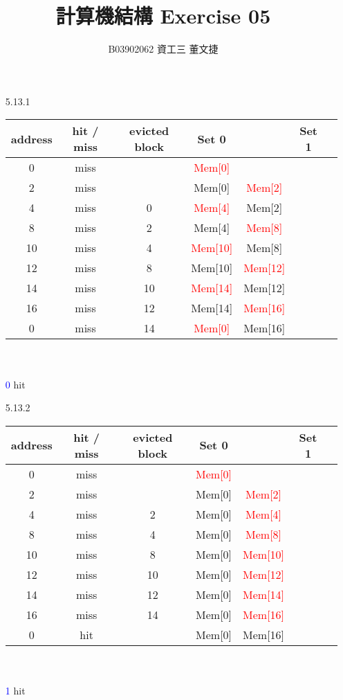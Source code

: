 \documentclass[12pt, a4paper]{article}
\date{}
\title{\vspace{-3.0cm} 計算機結構 \hspace{0cm} Exercise 05 \\ \vspace{0cm}}
\author{\normalsize B03902062 \hspace{0cm} 資工三 \hspace{0cm} 董文捷}
\begin{document}
\maketitle
\begin{itemize}[font=\bfseries]

\item[5.13.1]
\begin{tabular}[t]{|c|c|c|cc|cc|} 
\hline
address & hit / miss & evicted block & Set 0 &  & Set 1 & \\
\hline
0 & miss & & \textcolor{red}{Mem[0]} & & & \\
\hline
2 & miss & & Mem[0] & \textcolor{red}{Mem[2]} & & \\
\hline
4 & miss & 0 & \textcolor{red}{Mem[4]} & Mem[2] & & \\
\hline
8 & miss & 2 & Mem[4] & \textcolor{red}{Mem[8]} & & \\
\hline
10 & miss & 4 & \textcolor{red}{Mem[10]} & Mem[8] & & \\
\hline
12 & miss & 8 & Mem[10] & \textcolor{red}{Mem[12]} & & \\
\hline
14 & miss & 10 & \textcolor{red}{Mem[14]} & Mem[12] & & \\
\hline
16 & miss & 12 & Mem[14] & \textcolor{red}{Mem[16]} & & \\
\hline
0 & miss & 14 & \textcolor{red}{Mem[0]} & Mem[16] & & \\
\hline
\end{tabular} \\
\vspace*{0.2cm} \\
\textcolor{blue}{0} hit

\item[5.13.2]
\begin{tabular}[t]{|c|c|c|cc|cc|} 
\hline
address & hit / miss & evicted block & Set 0 &  & Set 1 & \\
\hline
0 & miss & & \textcolor{red}{Mem[0]} & & & \\
\hline
2 & miss & & Mem[0] & \textcolor{red}{Mem[2]} & & \\
\hline
4 & miss & 2 & Mem[0] & \textcolor{red}{Mem[4]} & & \\
\hline
8 & miss & 4 & Mem[0] & \textcolor{red}{Mem[8]} & & \\
\hline
10 & miss & 8 & Mem[0] & \textcolor{red}{Mem[10]} & & \\
\hline
12 & miss & 10 & Mem[0] & \textcolor{red}{Mem[12]} & & \\
\hline
14 & miss & 12 & Mem[0] & \textcolor{red}{Mem[14]} & & \\
\hline
16 & miss & 14 & Mem[0] & \textcolor{red}{Mem[16]} & & \\
\hline
0 & hit & & Mem[0] & Mem[16] & & \\
\hline
\end{tabular} \\
\vspace*{0.2cm} \\
\textcolor{blue}{1} hit


\end{itemize}
\end{document}
